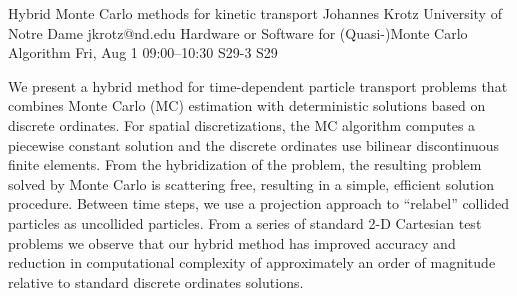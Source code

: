 \begin{talk}


\end{talk}

\begin{talk}
  {Hybrid Monte Carlo methods for kinetic transport}%
  {Johannes Krotz}%
  {University of Notre Dame}%
  {jkrotz@nd.edu}%
  {Hardware or Software for (Quasi-)Monte Carlo Algorithm}%
  {}%
  {Fri, Aug 1 09:00–10:30}%
  {S29-3}%
  {S29}%
				
			

We present a hybrid method for time-dependent particle transport problems that combines Monte Carlo (MC) estimation with deterministic solutions based on discrete ordinates. For spatial discretizations, the MC algorithm computes a piecewise constant solution and the discrete ordinates use bilinear discontinuous finite elements. From the hybridization of the problem, the resulting problem solved by Monte Carlo is scattering free, resulting in a simple, efficient solution procedure. Between time steps, we use a projection approach to “relabel” collided particles as uncollided particles. From a series of standard 2-D Cartesian test problems we observe that our hybrid method has improved accuracy and reduction in computational complexity of approximately an order of magnitude relative to standard discrete ordinates solutions.

\end{talk}
